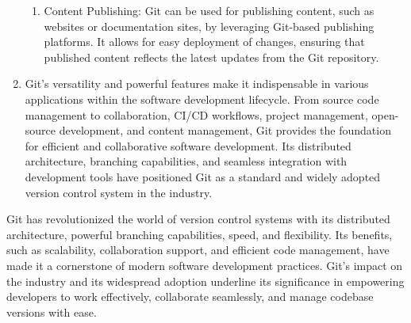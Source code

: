 \begin{enumerate}
\begin{enumerate}
        \item Content Publishing: Git can be used for publishing content, such as websites or documentation sites, by leveraging Git-based publishing platforms. It allows for easy deployment of changes, ensuring that published content reflects the latest updates from the Git repository.
    \end{enumerate}
    \item Git's versatility and powerful features make it indispensable in various applications within the software development lifecycle. From source code management to collaboration, CI/CD workflows, project management, open-source development, and content management, Git provides the foundation for efficient and collaborative software development. Its distributed architecture, branching capabilities, and seamless integration with development tools have positioned Git as a standard and widely adopted version control system in the industry.
\end{enumerate}


Git has revolutionized the world of version control systems with its distributed architecture, powerful branching capabilities, speed, and flexibility. Its benefits, such as scalability, collaboration support, and efficient code management, have made it a cornerstone of modern software development practices. Git's impact on the industry and its widespread adoption underline its significance in empowering developers to work effectively, collaborate seamlessly, and manage codebase versions with ease.


